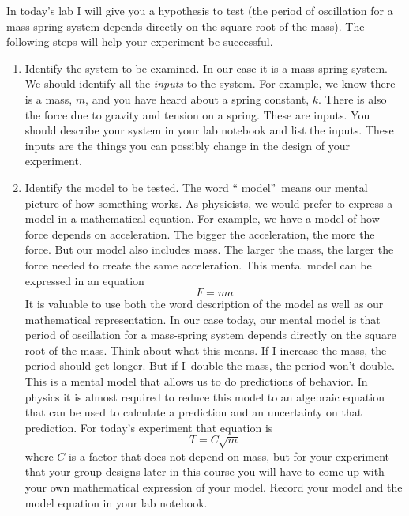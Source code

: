 \documentclass[twoside,11pt,ShortChapTitles]{BYUTextbook}
\begin{document}
In today's lab I will give you a hypothesis to test (the period of oscillation
for a mass-spring system depends directly on the square root of the mass). The
following steps will help your experiment be successful.

\begin{enumerate}
\item Identify the system to be examined. In our case it is a mass-spring
system. We should identify all the \emph{inputs} to the system. For example,
we know there is a mass, $m$, and you have heard about a spring constant, $k.
$ There is also the force due to gravity and tension on a spring. These are
inputs. You should describe your system in your lab notebook and list the
inputs. These inputs are the things you can possibly change in the design of
your experiment.

\item Identify the model to be tested. The word \textquotedblleft
model\textquotedblright\ means our mental picture of how something works. As
physicists, we would prefer to express a model in a mathematical equation. For
example, we have a model of how force depends on acceleration. The bigger the
acceleration, the more the force. But our model also includes mass. The larger
the mass, the larger the force needed to create the same acceleration. This
mental model can be expressed in an equation
\[
F=ma
\]
It is valuable to use both the word description of the model as well as our
mathematical representation. In our case today, our mental model is that
period of oscillation for a mass-spring system depends directly on the square
root of the mass. Think about what this means. If I increase the mass, the
period should get longer. But if I\ double the mass, the period won't double.
This is a mental model that allows us to do predictions of behavior. In
physics it is almost required to reduce this model to an algebraic equation
that can be used to calculate a prediction and an uncertainty on that
prediction. For today's experiment that equation is
\[
T=C\sqrt{m}
\]
where $C$ is a factor that does not depend on mass, but for your experiment
that your group designs later in this course you will have to come up with
your own mathematical expression of your model. Record your model and the
model equation in your lab notebook.


\end{enumerate}
\end{document}
